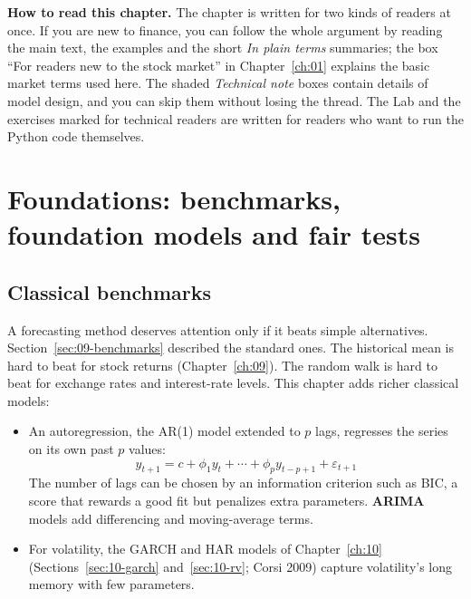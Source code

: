 \begin{callout}
\textbf{How to read this chapter.} The chapter is written for two kinds of readers at once. If you are new to finance, you can follow the whole argument by reading the main text, the examples and the short \emph{In plain terms} summaries; the box ``For readers new to the stock market'' in Chapter~\ref{ch:01} explains the basic market terms used here. The shaded \emph{Technical note} boxes contain details of model design, and you can skip them without losing the thread. The Lab and the exercises marked for technical readers are written for readers who want to run the Python code themselves.
\end{callout}

\section{Foundations: benchmarks, foundation models and fair tests}
\label{sec:21-foundations}

\subsection{Classical benchmarks}

A forecasting method deserves attention only if it beats simple alternatives. Section~\ref{sec:09-benchmarks} described the standard ones. The historical mean is hard to beat for stock returns (Chapter~\ref{ch:09}). The random walk is hard to beat for exchange rates and interest-rate levels. This chapter adds richer classical models:
\begin{itemize}
  \item An autoregression, the AR(1) model extended to $p$ lags, regresses the series on its own past $p$ values:
  \begin{equation}
    y_{t+1} = c + \phi_1 y_t + \cdots + \phi_p y_{t-p+1} + \varepsilon_{t+1}
    \label{eq:21-ar}
  \end{equation}
  The number of lags can be chosen by an information criterion such as BIC, a score that rewards a good fit but penalizes extra parameters. \textbf{ARIMA} models add differencing and moving-average terms.
  \item For volatility, the GARCH and HAR models of Chapter~\ref{ch:10} (Sections~\ref{sec:10-garch} and~\ref{sec:10-rv}; Corsi 2009) capture volatility's long memory with few parameters.
\end{itemize}

